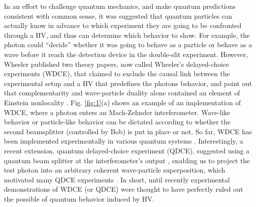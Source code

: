 \documentclass[aps,prl,twocolumn,amsmath,amssymb,nofootinbib,superscriptaddress]{revtex4-1}
\begin{document}
In an effort to challenge quantum mechanics, and make quantum predictions consistent with common sense, it was suggested that quantum particles can actually know in advance to which experiment they are going to be confronted through a HV, and thus can determine which behavior to show. For example, the photon could ``decide'' whether it was going to behave as a particle or behave as a wave before it reach the detection device in the double-slit experiment. However, Wheeler published two theory papers, now called  Wheeler's delayed-choice experiments (WDCE), that claimed to exclude the causal link between the experimental setup and a HV that predefines the photons behavior, and point out that complementarity and wave-particle duality alone contained an element of Einstein nonlocality \cite{Wheeler1978, Wheeler1984}. Fig. \ref{fig:1}(a) shows an example of an implementation of WDCE, where a photon enters an Mach-Zehnder interferometer.  Wave-like behavior or particle-like behavior can be dictated according to whether the second beamsplitter (controlled by Bob) is put in place or not.  
So far, WDCE has been implemented experimentally in various quantum systems \cite{hellmuth1987delayed, lawson1996delayed, kim2000delayed, zeilinger2005happy, jacques2007experimental, Vedovatoe1701180}. Interestingly, a recent extension, quantum delayed-choice experiment (QDCE), suggested using a quantum beam splitter at the interferometer's output \cite{ionicioiu2011proposal, ionicioiu2014wave}, enabling us to project the test photon into an arbitrary coherent wave-particle superposition, which motivated many QDCE experiments \cite{kaiser2012entanglement, peruzzo2012quantum, rab2017entanglement, Liue1603159}. In short, until recently experimental demonstrations of WDCE (or QDCE) were thought to have perfectly ruled out the possible of quantum behavior induced by HV.

\end{document}
